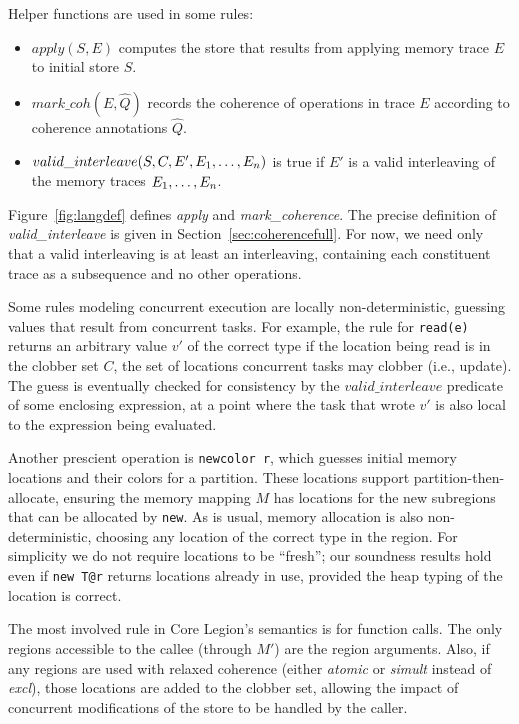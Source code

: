 Helper functions are used in some rules:
\begin{itemize}
\item $apply(S, E)$ computes the store that results from applying memory trace $E$ to initial store $S$.

\item $mark\_coh(E, \hat Q)$ records the coherence of operations in trace $E$ according to coherence annotations $\hat Q$. 

\item $valid\_interleave(S, C, E', {E}_1,\ldots,{E}_n)$ is true if $E'$ is a valid interleaving
of the memory traces ${E}_1,\ldots,{E}_n$.
\end{itemize}
Figure~\ref{fig:langdef} defines {\em apply} and {\em mark\_coherence}.  The precise definition of
{\em valid\_interleave} is given in Section~\ref{sec:coherencefull}.  For now, we need only that a valid interleaving
is at least an interleaving, containing each constituent trace as a subsequence and no other operations.

Some rules modeling concurrent execution are locally
non-deterministic, guessing values that result from
concurrent tasks.  For example, the rule for {\tt read(e)} returns an
arbitrary value $v'$ of the correct type if the location being read is
in the clobber set $C$, the set of locations concurrent tasks may
clobber (i.e., update).  The guess is eventually checked for
consistency by the $valid\_interleave$ predicate of some enclosing
expression, at a point where the task that wrote $v'$ is also local to
the expression being evaluated.

Another prescient operation is {\tt newcolor r}, which guesses initial
memory locations and their colors for a partition.  These locations
support partition-then-allocate, ensuring the memory mapping $M$ has
locations for the new subregions that can be allocated by {\tt new}.
As is usual, memory allocation is also non-deterministic, choosing any
location of the correct type in the region.  For simplicity we do not
require locations to be ``fresh''; our soundness results hold even if
{\tt new T@r} returns locations already in use, provided the heap
typing of the location is correct.

The most involved rule in Core Legion's semantics is for function calls.
The only regions accessible to the callee (through $M'$) are the region arguments.
Also, if any regions are used with relaxed coherence (either {\em atomic} or {\em simult} instead of
{\em excl}), those locations are added to the clobber set, allowing the
impact of concurrent modifications of the store to be handled by the caller.  

